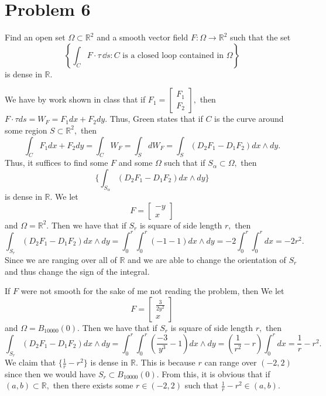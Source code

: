 \documentclass[11pt]{article}
\newcommand{\bbR}{\mathbb{R}}
\begin{document}
\section*{Problem 6}
\begin{problem}
    Find an open set $\Omega \subset \bbR^2$ and a smooth vector field $F :\Omega \to \bbR^2$ such that the set
\[ \left\{ \int_{C} F \cdot \tau \, \dd s : C \text{ is a closed loop contained
in } \Omega \right\}\]
is dense in $\bbR$.
\end{problem}
\begin{solution}
    We have by work shown in class that if $F_1 = \begin{bmatrix}
        F_1\\F_2
    \end{bmatrix},$ then $F\cdot \tau ds = W_F = F_1dx + F_2dy.$ Thus, Green states that if $C$ is the curve around some region $S \subset \bbR^2,$ then
    \[\int_C F_1dx + F_2dy = \int_C W_F = \int_S dW_F = \int_S(D_2F_1 - D_1F_2)dx \wedge dy.\] Thus, it suffices to find some $F$ and some $\Omega$ such that if $S_\alpha\subset \Omega,$ then 
    \[\{\int_{S_\alpha}(D_2F_1 - D_1F_2)dx \wedge dy\}\] is dense in $\bbR.$ We let 
    \[F = 
        \begin{bmatrix}
        -y\\x
    \end{bmatrix}\] and $\Omega = \bbR^2.$ Then we have that if $S_r$ is square of side length $r,$ then 
    \[\int_{S_r}(D_2F_1 - D_1F_2)dx \wedge dy = \int_0^r\int_0^r (-1 -1)dx\wedge dy = -2\int_0^r\int_0^r dx = -2r^2.\] Since we are ranging over all of $\bbR$ and we are able to change the orientation of $S_r$ and thus change the sign of the integral.  
\end{solution}
\begin{reflection}
    If $F$ were not smooth for the sake of me not reading the problem, then 
    We let 
    \[F = 
        \begin{bmatrix}
        \frac{3}{2y^2}\\x
    \end{bmatrix}\] and $\Omega = B_{10000}(0).$ Then we have that if $S_r$ is square of side length $r,$ then 
    \[\int_{S_r}(D_2F_1 - D_1F_2)dx \wedge dy = \int_0^r\int_0^r (\frac{-3}{y^3} -1)dx\wedge dy = (\frac{1}{r^2}-r)\int_0^r dx = \frac{1}{r} -r^2.\] We claim that $\{\frac{1}{r}-r^2\}$ is dense in $\bbR.$ This is because $r$ can range over $(-2,2)$ since then we would have $S_{r}\subset B_{10000}(0).$ From this, it is obvious that if $(a,b)\subset \bbR,$ then there exists some $r\in (-2,2)$ such that $\frac{1}{r} - r^2 \in (a,b).$
\end{reflection}
\end{document}
